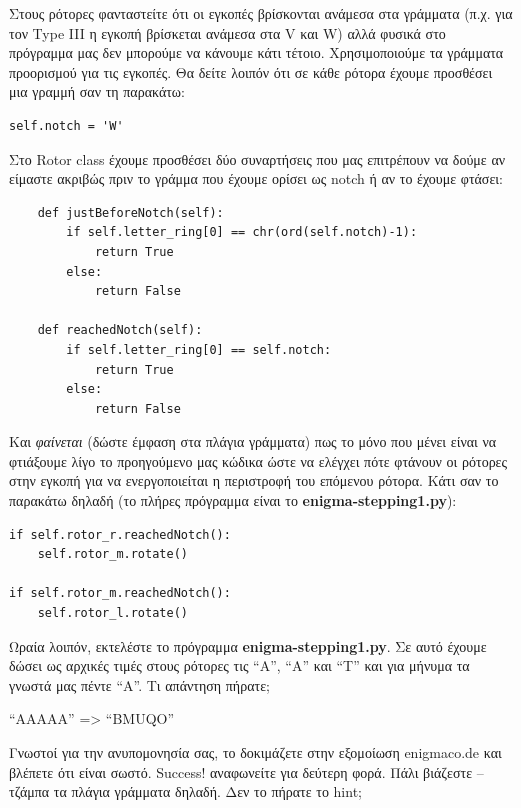 \documentclass[a4paper,twoside,12pt]{article}
\begin{document}
Στους ρότορες φανταστείτε ότι οι εγκοπές βρίσκονται ανάμεσα στα γράμματα (π.χ. για τον Type III η εγκοπή βρίσκεται ανάμεσα στα V και W) αλλά φυσικά στο πρόγραμμα μας δεν μπορούμε να κάνουμε κάτι τέτοιο. Χρησιμοποιούμε τα γράμματα προορισμού για τις εγκοπές. Θα δείτε λοιπόν ότι σε κάθε ρότορα έχουμε προσθέσει μια γραμμή σαν τη παρακάτω:

\begin{verbatim}
self.notch = 'W'
\end{verbatim}

Στο Rotor class έχουμε προσθέσει δύο συναρτήσεις που μας επιτρέπουν να δούμε αν είμαστε ακριβώς πριν το γράμμα που έχουμε ορίσει ως notch ή αν το έχουμε φτάσει:

\begin{verbatim}
    def justBeforeNotch(self):
        if self.letter_ring[0] == chr(ord(self.notch)-1):
            return True
        else:
            return False

    def reachedNotch(self):
        if self.letter_ring[0] == self.notch:
            return True
        else:
            return False
\end{verbatim}

Και \emph{φαίνεται} (δώστε έμφαση στα πλάγια γράμματα) πως το μόνο που μένει είναι να φτιάξουμε λίγο το προηγούμενο μας κώδικα ώστε να ελέγχει πότε φτάνουν οι ρότορες στην εγκοπή για να ενεργοποιείται η περιστροφή του επόμενου ρότορα. Κάτι σαν το παρακάτω δηλαδή (το πλήρες πρόγραμμα είναι το \textbf{enigma-stepping1.py}):

\begin{verbatim}
if self.rotor_r.reachedNotch():
    self.rotor_m.rotate()

if self.rotor_m.reachedNotch():
    self.rotor_l.rotate()
\end{verbatim}

Ωραία λοιπόν, εκτελέστε το πρόγραμμα \textbf{enigma-stepping1.py}. Σε αυτό έχουμε δώσει ως αρχικές τιμές στους ρότορες τις “A”, “A” και “Τ” και για μήνυμα τα γνωστά μας πέντε “Α”. Τι απάντηση πήρατε;

“AAAAA” => “BMUQO”

Γνωστοί για την ανυπομονησία σας, το δοκιμάζετε στην εξομοίωση enigmaco.de και βλέπετε ότι είναι σωστό. Success! αναφωνείτε για δεύτερη φορά. Πάλι βιάζεστε – τζάμπα τα πλάγια γράμματα δηλαδή. Δεν το πήρατε το hint;
\end{document}
